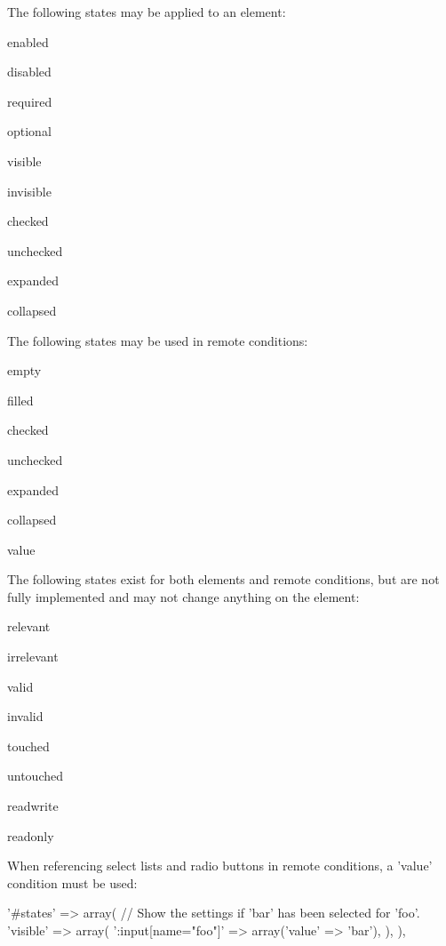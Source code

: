 The following states may be applied to an element:
\begin{DoxyItemize}
\item enabled
\item disabled
\item required
\item optional
\item visible
\item invisible
\item checked
\item unchecked
\item expanded
\item collapsed
\end{DoxyItemize}

The following states may be used in remote conditions:
\begin{DoxyItemize}
\item empty
\item filled
\item checked
\item unchecked
\item expanded
\item collapsed
\item value
\end{DoxyItemize}

The following states exist for both elements and remote conditions, but are not fully implemented and may not change anything on the element:
\begin{DoxyItemize}
\item relevant
\item irrelevant
\item valid
\item invalid
\item touched
\item untouched
\item readwrite
\item readonly
\end{DoxyItemize}

When referencing select lists and radio buttons in remote conditions, a 'value' condition must be used: 
\begin{DoxyCode}
   '#states' => array(
     // Show the settings if 'bar' has been selected for 'foo'.
     'visible' => array(
       ':input[name="foo"]' => array('value' => 'bar'),
     ),
   ),
\end{DoxyCode}



